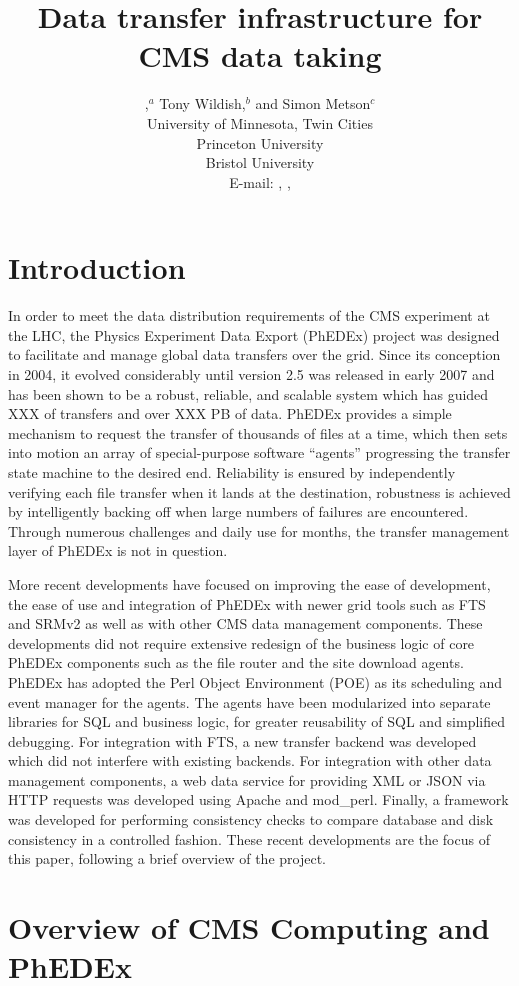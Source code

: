 \documentclass{PoS}
\title{Data transfer infrastructure for CMS data taking}
\author{
  \speaker{Ricky Egeland},$^a$ Tony Wildish,$^{b}$ and Simon Metson$^{c}$\\ 
  \llap{$^a$}University of Minnesota, Twin Cities\\ 
  \llap{$^b$}Princeton University\\ 
  \llap{$^c$}Bristol University\\ 
  E-mail: \email{Ricky.Egeland@cern.ch}, \email{Tony.Wildish@cern.ch}, \email{Simon.Metson@cern.ch}
}
\begin{document}
\section{Introduction}

In order to meet the data distribution requirements of the CMS
experiment at the LHC, the Physics Experiment Data Export (PhEDEx)
project was designed to facilitate and manage global data transfers
over the grid.  Since its conception in 2004, it evolved considerably
until version 2.5 was released in early 2007 and has been shown to be
a robust, reliable, and scalable system which has guided XXX of
transfers and over XXX PB of data.  PhEDEx provides a simple mechanism
to request the transfer of thousands of files at a time, which then
sets into motion an array of special-purpose software ``agents''
progressing the transfer state machine to the desired end.
Reliability is ensured by independently verifying each file transfer
when it lands at the destination, robustness is achieved by
intelligently backing off when large numbers of failures are
encountered.  Through numerous challenges and daily use for months,
the transfer management layer of PhEDEx is not in question.

More recent developments have focused on improving the ease of
development, the ease of use and integration of PhEDEx with newer grid
tools such as FTS and SRMv2 as well as with other CMS data management
components.  These developments did not require extensive redesign of
the business logic of core PhEDEx components such as the file router
and the site download agents.  PhEDEx has adopted the Perl Object
Environment (POE) as its scheduling and event manager for the agents.
The agents have been modularized into separate libraries for SQL and
business logic, for greater reusability of SQL and simplified
debugging.  For integration with FTS, a new transfer backend was
developed which did not interfere with existing backends.  For
integration with other data management components, a web data service
for providing XML or JSON via HTTP requests was developed using Apache
and mod\_perl.  Finally, a framework was developed for performing
consistency checks to compare database and disk consistency in a
controlled fashion.  These recent developments are the focus of this
paper, following a brief overview of the project.

\section{Overview of CMS Computing and PhEDEx}
\end{document}
